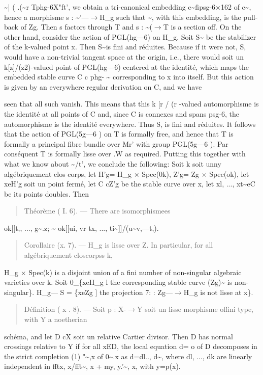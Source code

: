 \documentclass[11pt]{article}
\theoremstyle{plain}
\theoremstyle{definition}
\theoremstyle{remark}
\begin{document}
\textasciitilde{}| ( .(\textasciitilde{}r Tphg-6X"ft', we obtain a tri-canonical embedding c\textasciitilde{}fipsg-6$\times$162 of c\textasciitilde{}, hence a morphisme s : \textasciitilde{}'---$\to$H\_g such that \textasciitilde{}, with this embedding, is the pull-back of Zg. Then s factors through T and s : \textasciitilde{}($\to$T is a section off. On the other hand, consider the action of PGL(hg---6) on H\_g. Soit S\textasciitilde{} be the stabilizer of the k-valued point x. Then S\textasciitilde{}is fini and r\'eduites. Because if it were not, S, would have a non-trivial tangent space at the origin, i.e., there would soit un k[z]/(z2)-valued point of PGL(hg---6) centered at the identit\'e, which maps the embedded stable curve C c phg- \textasciitilde{} corresponding to x into itself. But this action is given by an everywhere regular derivation on C, and we have

seen that all such vanish. This means that this k [r / (r -valued automorphisme is the identit\'e at all points of C and, since C is connexes and spans psg-6, the automorphisme is the identit\'e everywhere. Thus S, is fini and r\'eduites. It follows that the action of PGL(5g---6 ) on T is formally free, and hence that T is formally a principal fibre bundle over Mr' with group PGL(5g---6 ). Par cons\'equent T is formally lisse over .W as required. Putting this together with what we know about \textasciitilde{}/t', we conclude the following: Soit k soit unny alg\'ebriquement clos corps, let H'g= H\_g $\times$ Spec(0k), Z'g= Zg $\times$ Spec(ok), let xeH'g soit un point ferm\'e, let C cZ'g be the stable curve over x, let xl, ..., xt\textasciitilde{}eC be its points doubles. Then

\begin{quote}Th\'eor\`eme ( I. 6). --- There are isomorphismees\end{quote}
ok[[t,, ..., g\textasciitilde{}.z; \textasciitilde{} ok[[ui, vr tx, ..., ti\textasciitilde{}]]/(u\textasciitilde{}v,---t,).

\begin{quote}Corollaire (x. 7). --- H\_g is lisse over Z. In particular, for all alg\'ebriquement closcorpss k,\end{quote}
H\_g $\times$ Spec(k) is a disjoint union of a fini number of non-singular algebraic varieties over k. Soit 0\_\{xeH\_g l the corresponding stable curve (Zg)\textasciitilde{} is non-singular\}. H\_g--- S = \{xeZg ] the projection 7: : Zg---$\to$H\_g is not lisse at x\}.

\begin{quote}D\'efinition ( x . 8). --- Soit p : X-$\to$Y soit un lisse morphisme offini type, with Y a noetherian\end{quote}
sch\'ema, and let D cX soit un relative Cartier divisor. Then D has normal crossings relative to Y if for all xED, the local equation d= o of D decomposes in the strict completion (1) "\textasciitilde{},x of 0\textasciitilde{}.x as d=dl.., d\textasciitilde{}, where dl, ..., dk are linearly independent in fftx, x/fft\textasciitilde{}, x + my, y.'\textasciitilde{}, x, with y=p(x).
\end{document}
